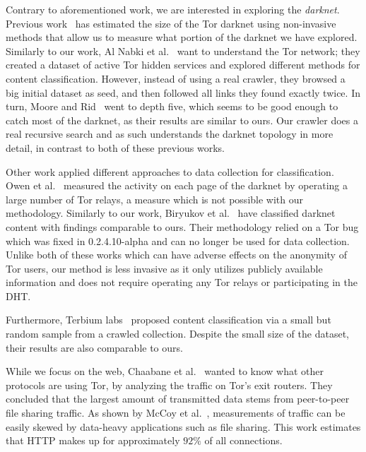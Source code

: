 \documentclass[USenglish,oneside,twocolumn]{article}
\begin{document}
Contrary to aforementioned work, we are interested in exploring the \emph{darknet}.
Previous work~\cite{GeorgeKadianakis2015, TorMetricsOnion} has estimated the size of the Tor darknet using non-invasive methods that allow us to measure what portion of the darknet we have explored.
Similarly to our work, Al Nabki et al.~\cite{Nabki2017} want to understand the Tor network; they created a dataset of active Tor hidden services and explored different methods for content classification. However, instead of using a real crawler, they browsed a big initial dataset as seed, and then followed all links they found exactly twice. In turn, Moore and Rid~\cite{Moore2016} went to depth five, which seems to be good enough to catch most of the darknet, as their results are similar to ours. Our crawler does a real recursive search and as such understands the darknet topology in more detail, in contrast to both of these previous works.

Other work applied different approaches to data collection for classification.
Owen et al.~\cite{Owen2016} measured the activity on each page of the darknet by operating a large number of Tor relays, a measure which is not possible with our methodology. Similarly to our work, Biryukov et al.~\cite{Biryukov2014} have classified darknet content with findings comparable to ours. Their methodology relied on a Tor bug which was fixed in 0.2.4.10-alpha and can no longer be used for data collection. Unlike both of these works which can have adverse effects on the anonymity of Tor users, our method is less invasive as it only utilizes publicly available information and does not require operating any Tor relays or participating in the DHT.

Furthermore, Terbium labs~\cite{ClareGollnick2016} proposed content classification via a small but random sample from a crawled collection. Despite the small size of the dataset, their results are also comparable to ours.

While we focus on the web, Chaabane et al.~\cite{Chaabane2010} wanted to know what other protocols are using Tor, by analyzing the traffic on Tor's exit routers. They concluded that the largest amount of transmitted data stems from peer-to-peer file sharing traffic. As shown by McCoy et al.~\cite{McCoy2008}, measurements of traffic can be easily skewed by data-heavy applications such as file sharing. This work estimates that HTTP makes up for approximately $92\%$ of all connections. 
\end{document}
